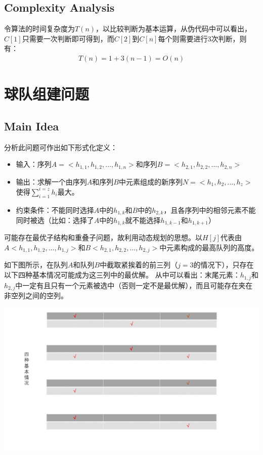 \documentclass{ctexart}
\begin{document}
\subsection{Complexity Analysis}
令算法的时间复杂度为$T(n)$，以比较判断为基本运算，从伪代码中可以看出，$C[1]$只需要一次判断即可得到，而$C[2]$到$C[n]$每个则需要进行3次判断，则有：
\begin{align*}
   T(n)=1+3(n-1)=O(n) 
\end{align*}

\section{球队组建问题}

\subsection{Main Idea}
分析此问题可作出如下形式化定义：
\begin{itemize}
    \item 输入：序列$A=<h_{1,1},h_{1,2},\ldots,h_{1,n}>$和序列$B=<h_{2,1},h_{2,2},\ldots,h_{2,n}>$
    \item 输出：求解一个由序列$A$和序列$B$中元素组成的新序列$N=<h_1,h_2,\ldots,h_z>$使得$\sum_{i=1}^{i=z} h_i$最大。
    \item 约束条件：不能同时选择$A$中的$h_{1,k}$和$B$中的$h_{2,k}$，且各序列中的相邻元素不能同时被选（比如：选择了$A$中的$h_{1,k}$就不能选择$h_{1,k-1}$和$h_{1,k+1}$）
\end{itemize}


可能存在最优子结构和重叠子问题，故利用动态规划的思想。以$H[j]$代表由$A<h_{1,1},h_{1,2},\ldots,h_{1,j}>$和$B<h_{2,1},h_{2,2},\ldots,h_{2,j}>$中元素构成的最高队列的高度。

如下图所示，在队列$A$和队列$B$中截取紧挨着的前三列（$j=3$的情况下），只存在以下四种基本情况可能成为这三列中的最优解。
从中可以看出：末尾元素：$h_{1,j}$和$h_{2,j}$中一定有且只有一个元素被选中（否则一定不是最优解），而且可能存在夹在非空列之间的空列。

\includegraphics[width=1.0\textwidth]{幻灯片1.PNG}
\end{document}
